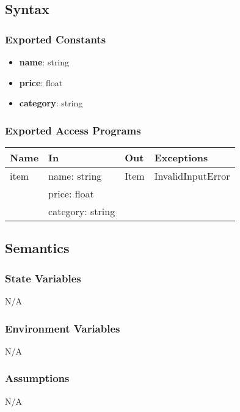 \documentclass[12pt, titlepage]{article}
\begin{document}
\subsection{Syntax}

\subsubsection{Exported Constants}
\begin{itemize}
  \item \textbf{name}: string
  \item \textbf{price}: float
  \item \textbf{category}: string
\end{itemize}

\subsubsection{Exported Access Programs}

\begin{center}
\begin{tabular}{p{4cm} p{4cm} p{4cm} p{4cm}}
\hline
\textbf{Name} & \textbf{In} & \textbf{Out} & \textbf{Exceptions} \\
\hline
item & name: string & Item & InvalidInputError \\
 & price: float &  &  \\
 & category: string &  &  \\
\hline
\end{tabular}
\end{center}

\subsection{Semantics}

\subsubsection{State Variables}
N/A

\subsubsection{Environment Variables}
N/A

\subsubsection{Assumptions}
N/A
\end{document}
